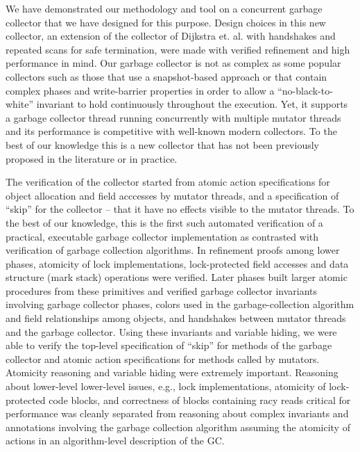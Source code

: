 We have demonstrated our methodology and tool on a concurrent garbage collector that we have designed for this purpose. Design choices in this new collector, an extension of the collector of Dijkstra et. al. \cite{dijk78}  with handshakes \cite{doli93,doli94} and repeated scans for safe termination, were made with verified refinement and high performance in mind. Our garbage collector is not as complex as some popular collectors such as those that use a snapshot-based approach \cite{doli93,doli94,doma00,azat03} or that contain complex phases and write-barrier properties \cite{boeh91,prin00a,bara05} in order to allow a ``no-black-to-white'' invariant to hold continuously throughout the execution. Yet, it supports a garbage collector thread running concurrently with multiple mutator threads and its performance is competitive with well-known modern collectors. To the best of our knowledge this is a new collector that has not been previously proposed in the literature or in practice. 

The verification of the collector started from atomic action specifications for object allocation and field acccesses by mutator threads, and a specification of ``skip'' for the collector -- that it have no effects visible to the mutator threads. To the best of our knowledge, this is the first such automated verification of a practical, executable garbage collector implementation as contrasted with verification of garbage collection algorithms. In refinement proofs among lower phases, atomicity of lock implementations, lock-protected field accesses and data structure (mark stack) operations were verified. Later phases built larger atomic procedures from these primitives and verified garbage collector invariants involving garbage collector phases, colors used in the garbage-collection algorithm and field relationships among objects, and handshakes between mutator threads and the garbage collector. Using these invariants and variable hiding, we were able to verify the top-level specification of  ``skip'' for methods of the garbage collector and atomic action specifications for methods called by mutators. Atomicity reasoning and variable hiding were extremely important. Reasoning about lower-level lower-level issues, e.g., lock implementations, atomicity of lock-protected code blocks, and correctness of blocks containing racy reads critical for performance was cleanly separated from reasoning about complex invariants and annotations involving the garbage collection algorithm assuming the atomicity of actions in an algorithm-level description of the GC.


